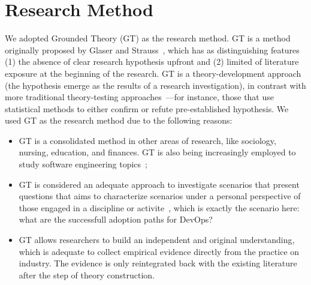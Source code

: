 \section{Research Method} \label{sec:research_method}

We adopted Grounded Theory (GT) as the research method. GT is a method
originally proposed by Glaser and Strauss~\cite{glase1967discovery}, which has
as distinguishing features (1) the absence of clear research hypothesis upfront
and (2) limited of literature exposure at the beginning of the research. GT
is a theory-development approach (the hypothesis emerge as the results of
a research investigation), in contrast with more traditional
theory-testing approaches~\cite{coleman2007using}---for instance,  those that
use statistical methods to either confirm or refute pre-established hypothesis.
We used GT as the research method due to the following reasons:



\begin{itemize}

\item GT is a consolidated method in other areas of research, like sociology,
nursing, education, and finances. GT is also being increasingly employed
to study software engineering topics~\cite{Hoda:2017:ICSE,stol2016grounded,Waterman:2015:ICSE};

\item GT is considered an adequate approach to investigate scenarios that present
  questions that aims to characterize scenarios under a personal perspective of those
  engaged in a discipline or activite~\cite{barnsteiner2002using},
which is exactly the scenario here: what are the successfull adoption paths for DevOps?

\item GT allows researchers to build an independent and original understanding,
which is adequate to collect empirical evidence directly from the
practice on industry. The evidence
is only reintegrated back with the existing literature after the step of
theory construction.

\end{itemize}

